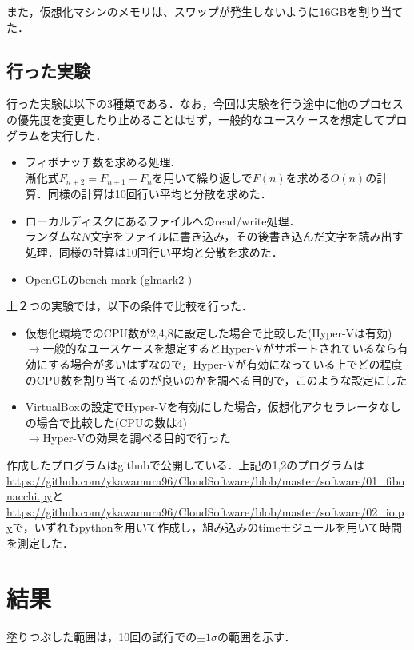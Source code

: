 \documentclass[onecolumn]{preport}
\begin{document}
また，仮想化マシンのメモリは、スワップが発生しないように16GBを割り当てた．

\subsection{行った実験}
行った実験は以下の3種類である．なお，今回は実験を行う途中に他のプロセスの優先度を変更したり止めることはせず，一般的なユースケースを想定してプログラムを実行した．

\begin {itemize}
\item フィボナッチ数を求める処理.\\ 漸化式$F_{n+2} = F_{n+1} + F_{n}$を用いて繰り返しで$F(n)$を求める$O(n)$の計算．同様の計算は10回行い平均と分散を求めた．
\item ローカルディスクにあるファイルへのread/write処理．\\ランダムな$N$文字をファイルに書き込み，その後書き込んだ文字を読み出す処理．同様の計算は10回行い平均と分散を求めた．
\item OpenGLのbench mark (glmark2 \cite{glmark2})
\end {itemize}

上２つの実験では，以下の条件で比較を行った．
\begin {itemize}
\item 仮想化環境でのCPU数が2,4,8に設定した場合で比較した(Hyper-Vは有効)\\ $\rightarrow$一般的なユースケースを想定するとHyper-Vがサポートされているなら有効にする場合が多いはずなので，Hyper-Vが有効になっている上でどの程度のCPU数を割り当てるのが良いのかを調べる目的で，このような設定にした
\item VirtualBoxの設定でHyper-Vを有効にした場合，仮想化アクセラレータなしの場合で比較した(CPUの数は4)\\ $\rightarrow$Hyper-Vの効果を調べる目的で行った
  
\end {itemize}

作成したプログラムはgithubで公開している\cite{myrepo}．上記の1,2のプログラムは\url{https://github.com/ykawamura96/CloudSoftware/blob/master/software/01_fibonacchi.py}と\url{https://github.com/ykawamura96/CloudSoftware/blob/master/software/02_io.py}で，いずれもpythonを用いて作成し，組み込みのtimeモジュールを用いて時間を測定した．

\section{結果}
塗りつぶした範囲は，10回の試行での$\pm 1 \sigma$の範囲を示す．
\end{document}
